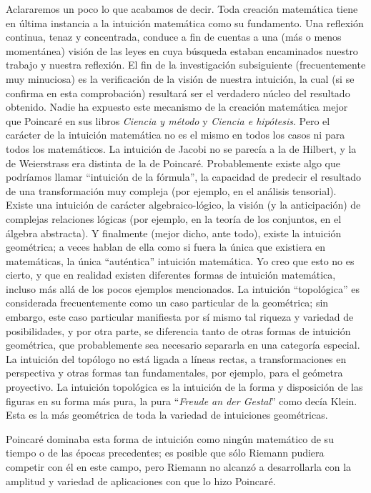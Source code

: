 \documentclass[a4paper, 12pt]{article}
\begin{document}
Aclararemos un poco lo que acabamos de decir. Toda creación matemática tiene en última instancia a la intuición matemática como su fundamento. Una reflexión continua, tenaz y concentrada, conduce a fin de cuentas a una (más o menos momentánea) visión de las leyes en cuya búsqueda estaban encaminados nuestro  trabajo y nuestra reflexión. El fin de la investigación subsiguiente (frecuentemente muy minuciosa) es la verificación de la visión de nuestra intuición, la cual (si se confirma en esta comprobación) resultará ser el verdadero núcleo del resultado obtenido. Nadie ha expuesto este mecanismo de la creación matemática mejor que Poincaré en sus libros {\it Ciencia y método} y {\it Ciencia e hipótesis}. Pero el carácter de la intuición matemática no es el mismo en todos los casos ni para todos los matemáticos. La intuición de Jacobi no se parecía a la de Hilbert, y la de Weierstrass era  distinta de la de Poincaré.
Probablemente existe algo que podríamos llamar ``intuición de la fórmula'', la capacidad de predecir el resultado de una transformación muy compleja (por ejemplo, en el análisis tensorial). Existe una intuición de carácter algebraico-lógico, la visión (y la anticipación) de complejas relaciones lógicas (por ejemplo, en la teoría de los conjuntos, en el álgebra abstracta). Y finalmente (mejor dicho, ante todo), existe la intuición geométrica; a veces hablan de ella como si fuera la única que existiera en matemáticas, la única ``auténtica'' intuición matemática. Yo creo que esto no es 
cierto, y que en realidad existen diferentes formas  de intuición matemática, incluso más allá de los pocos ejemplos mencionados. La intuición ``topológica'' es considerada frecuentemente como un caso particular de la geométrica; sin embargo, este caso particular manifiesta por sí mismo tal riqueza y variedad de posibilidades, y por otra parte, se diferencia tanto de otras  formas de intuición geométrica, que probablemente sea necesario separarla en una categoría especial. La intuición del topólogo no está ligada a líneas rectas, a transformaciones en perspectiva y otras formas tan fundamentales, por ejemplo, para el geómetra proyectivo. La intuición topológica es la intuición de la forma y disposición de las figuras en su forma más pura, la pura ``{\it Freude an der Gestal}'' como decía Klein. Esta es la
más geométrica de toda la variedad de intuiciones geométricas.

Poincaré dominaba esta forma de intuición como
ningún matemático de su tiempo o de las épocas precedentes; es posible que sólo Riemann pudiera competir  con él en este campo, pero Riemann no alcanzó a desarrollarla con la amplitud y variedad de aplicaciones  con que lo hizo Poincaré.
\end{document}
